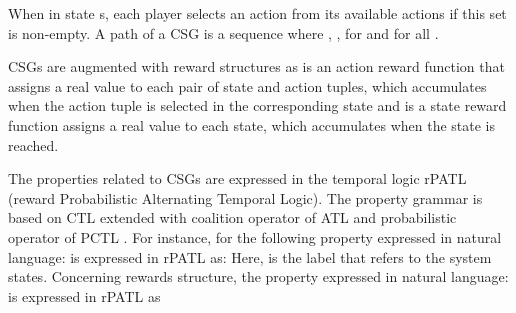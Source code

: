 When in state s, each player  selects an action from its available actions  if this set is non-empty.  A path \emath{\pi} of a CSG  \cite{kwiatkowskaautomatic2021, fismancorrelated2022} is a sequence  where , ,  for  and  for all . 


CSGs are augmented with reward structures \cite{kwiatkowskaautomatic2021}  as  is an action reward function that assigns a real value to each pair of state and action tuples, which accumulates when the action tuple is selected in the corresponding state and   is a state reward function assigns a real value to each state, which accumulates when the state is reached.


The properties related to CSGs are expressed in the temporal logic rPATL \cite{hutchisonautomatic2012} (reward Probabilistic Alternating Temporal Logic). The property grammar is based on CTL \cite{baierprinciples2008} extended with coalition operator  of ATL \cite{Alur2002} and probabilistic operator  of PCTL \cite{hanssonlogic1994}. For instance, for the following property expressed in natural language:  is expressed in rPATL as:  Here,  is the label that refers to the system states. Concerning rewards structure, the property expressed in natural language:  is expressed  in rPATL as 


